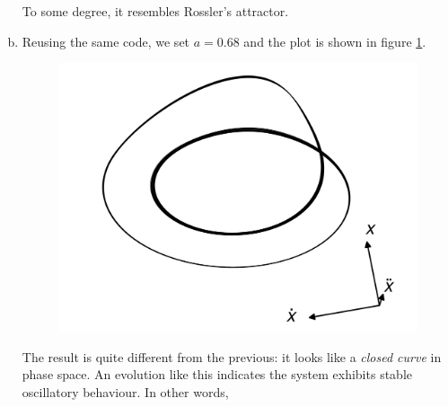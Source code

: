 \begin{enumerate}[(a)]
    To some degree, it resembles Rossler's attractor. 

    \item Reusing the same code, we set $a = 0.68$ and the plot
    is shown in figure \ref{fig:6c}. 
    \begin{figure}[!ht]
        \centering
        \includegraphics[scale=0.10]{images/6c.png}
        \label{fig:6c}
    \end{figure}

    The result is quite different from the previous: it looks like
    a \textit{closed curve} in phase space. An evolution like this 
    indicates the system exhibits stable oscillatory behaviour. In
    other words, 
\end{enumerate} 

\newpage
\vspace{0.1ex}




